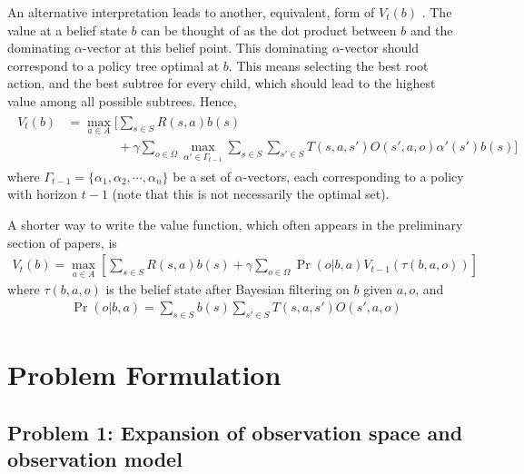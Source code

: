 \documentclass{article}
\begin{document}
An alternative interpretation leads to another, equivalent, form of $V_t(b)$ \cite{pineau2003point}. The value at a belief state $b$ can be thought of as the dot product between $b$ and the dominating $\alpha$-vector at this belief point. This dominating $\alpha$-vector should correspond to a policy tree optimal at $b$. This means selecting the best root action, and the best subtree for every child, which should lead to the highest value among all possible subtrees. Hence,
\begin{align}
\begin{split}
V_t(b) &= \max_{a\in A} \Bigg[ \sum_{s\in S} R(s,a)b(s)\\
&\qquad\qquad+ \gamma \sum_{o\in\Omega} \max_{\alpha'\in \Gamma_{t-1}} \sum_{s\in S} \sum_{s'\in S} T(s,a,s')O(s',a,o)\alpha'(s')b(s)  \Bigg]
\end{split}
\end{align}
where $\Gamma_{t-1}=\{\alpha_1,\alpha_2,\cdots,\alpha_n\}$ be a set of $\alpha$-vectors, each corresponding to a policy with horizon $t-1$ (note that this is not necessarily the optimal set).

A shorter way to write the value function, which often appears in the preliminary section of papers, is \cite{lee2007makes}
\begin{align}
V_t(b) = \max_{a\in A}\left[ \sum_{s\in S} R(s,a)b(s) + \gamma \sum_{o\in\Omega} \Pr(o | b,a) V_{t-1}(\tau(b,a,o))   \right]
\end{align}
where $\tau(b,a,o)$ is the belief state after Bayesian filtering on $b$ given $a,o$, and
\begin{align}
\Pr(o | b,a) = \sum_{s\in S}b(s)\sum_{s'\in S}T(s,a,s')O(s',a,o)
\end{align}






\section{Problem Formulation}

\subsection{Problem 1: Expansion of observation space and observation model}
\end{document}
